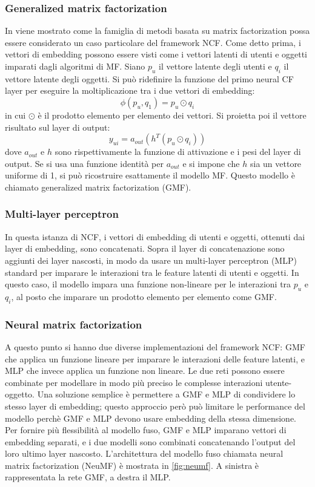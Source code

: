 \subsubsection{Generalized matrix factorization}
In \cite{NCF} viene mostrato come la famiglia di metodi basata su matrix factorization possa essere considerato un caso particolare del framework NCF. Come detto prima, i vettori di embedding possono essere visti come i vettori latenti di utenti e oggetti imparati dagli algoritmi di MF. Siano $p_u$ il vettore latente degli utenti e $q_i$ il vettore latente degli oggetti. Si può ridefinire la funzione del primo neural CF layer per eseguire la moltiplicazione tra i due vettori di embedding:
$$
\phi(p_u, q_1) = p_u \odot q_i
$$
in cui $\odot$ è il prodotto elemento per elemento dei vettori. Si proietta poi il vettore risultato sul layer di output:
$$
y_{ui} = a_{out}(h^T(p_u \odot q_i))
$$
dove $a_{out}$ e $h$ sono rispettivamente la funzione di attivazione e  i pesi del layer di output.  Se si usa una funzione identità per $a_{out}$ e si impone che $h$ sia un vettore uniforme di 1, si può ricostruire esattamente il modello MF. Questo modello è chiamato generalized matrix factorization (GMF).

\subsubsection{Multi-layer perceptron}
In questa istanza di NCF, i vettori di embedding di utenti e oggetti, ottenuti dai layer di embedding, sono concatenati. Sopra il layer di concatenazione sono aggiunti dei layer nascosti, in modo da usare un multi-layer perceptron (MLP) standard per imparare le interazioni tra le feature latenti di utenti e oggetti. In questo caso, il modello impara una funzione non-lineare per le interazioni tra $p_u$ e $q_i$, al posto che imparare un prodotto elemento per elemento come GMF. 

\subsubsection{Neural matrix factorization}
A questo punto si hanno due diverse implementazioni del framework NCF: GMF che applica un funzione lineare per imparare le interazioni delle feature latenti, e MLP che invece applica un funzione non lineare. Le due reti possono essere combinate per modellare in modo più preciso le complesse interazioni utente-oggetto. Una soluzione semplice è permettere a GMF e MLP di condividere lo stesso layer di embedding; questo approccio però può limitare le performance del modello perchè GMF e MLP devono usare embedding della stessa dimensione. Per fornire più flessibilità al modello fuso, GMF e MLP imparano vettori di embedding separati, e i due modelli sono combinati concatenando l'output del loro ultimo layer nascosto. L'architettura del modello fuso chiamata neural matrix factorization (NeuMF) è mostrata in \autoref{fig:neumf}. A sinistra è rappresentata la rete GMF, a destra il MLP.

